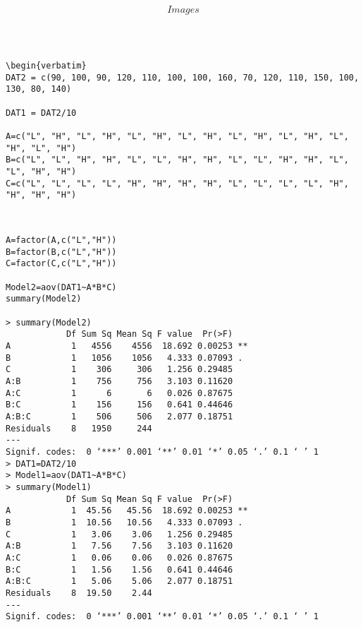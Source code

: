 \[Images\]

\newpage

\begin{verbatim}



\begin{verbatim}
DAT2 = c(90, 100, 90, 120, 110, 100, 100, 160, 70, 120, 110, 150, 100, 
130, 80, 140)

DAT1 = DAT2/10

A=c("L", "H", "L", "H", "L", "H", "L", "H", "L", "H", "L", "H", "L", "H", "L", "H")
B=c("L", "L", "H", "H", "L", "L", "H", "H", "L", "L", "H", "H", "L", "L", "H", "H")
C=c("L", "L", "L", "L", "H", "H", "H", "H", "L", "L", "L", "L", "H", "H", "H", "H") 
\end{verbatim}



\begin{verbatim}
    

A=factor(A,c("L","H"))
B=factor(B,c("L","H"))
C=factor(C,c("L","H"))

Model2=aov(DAT1~A*B*C)
summary(Model2)

> summary(Model2)
            Df Sum Sq Mean Sq F value  Pr(>F)   
A            1   4556    4556  18.692 0.00253 **
B            1   1056    1056   4.333 0.07093 . 
C            1    306     306   1.256 0.29485   
A:B          1    756     756   3.103 0.11620   
A:C          1      6       6   0.026 0.87675   
B:C          1    156     156   0.641 0.44646   
A:B:C        1    506     506   2.077 0.18751   
Residuals    8   1950     244                   
---
Signif. codes:  0 ‘***’ 0.001 ‘**’ 0.01 ‘*’ 0.05 ‘.’ 0.1 ‘ ’ 1 
> DAT1=DAT2/10
> Model1=aov(DAT1~A*B*C)
> summary(Model1)
            Df Sum Sq Mean Sq F value  Pr(>F)   
A            1  45.56   45.56  18.692 0.00253 **
B            1  10.56   10.56   4.333 0.07093 . 
C            1   3.06    3.06   1.256 0.29485   
A:B          1   7.56    7.56   3.103 0.11620   
A:C          1   0.06    0.06   0.026 0.87675   
B:C          1   1.56    1.56   0.641 0.44646   
A:B:C        1   5.06    5.06   2.077 0.18751   
Residuals    8  19.50    2.44                   
---
Signif. codes:  0 ‘***’ 0.001 ‘**’ 0.01 ‘*’ 0.05 ‘.’ 0.1 ‘ ’ 1 
\end{verbatim}



